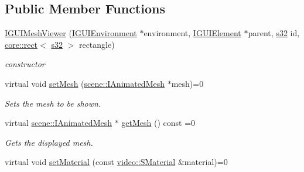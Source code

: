 \subsection*{Public Member Functions}
\begin{DoxyCompactItemize}
\item 
\mbox{\label{classirr_1_1gui_1_1IGUIMeshViewer_a36025535144bcd7fc8906071738db130}} 
\hyperlink{classirr_1_1gui_1_1IGUIMeshViewer_a36025535144bcd7fc8906071738db130}{I\+G\+U\+I\+Mesh\+Viewer} (\hyperlink{classirr_1_1gui_1_1IGUIEnvironment}{I\+G\+U\+I\+Environment} $\ast$environment, \hyperlink{classirr_1_1gui_1_1IGUIElement}{I\+G\+U\+I\+Element} $\ast$parent, \hyperlink{namespaceirr_ac66849b7a6ed16e30ebede579f9b47c6}{s32} id, \hyperlink{classirr_1_1core_1_1rect}{core\+::rect}$<$ \hyperlink{namespaceirr_ac66849b7a6ed16e30ebede579f9b47c6}{s32} $>$ rectangle)
\begin{DoxyCompactList}\small\item\em constructor \end{DoxyCompactList}\item 
\mbox{\label{classirr_1_1gui_1_1IGUIMeshViewer_a1af18c83f050af42cdd9f76df28659ec}} 
virtual void \hyperlink{classirr_1_1gui_1_1IGUIMeshViewer_a1af18c83f050af42cdd9f76df28659ec}{set\+Mesh} (\hyperlink{classirr_1_1scene_1_1IAnimatedMesh}{scene\+::\+I\+Animated\+Mesh} $\ast$mesh)=0
\begin{DoxyCompactList}\small\item\em Sets the mesh to be shown. \end{DoxyCompactList}\item 
\mbox{\label{classirr_1_1gui_1_1IGUIMeshViewer_a2e61772e79bec9c9580016151b98f37b}} 
virtual \hyperlink{classirr_1_1scene_1_1IAnimatedMesh}{scene\+::\+I\+Animated\+Mesh} $\ast$ \hyperlink{classirr_1_1gui_1_1IGUIMeshViewer_a2e61772e79bec9c9580016151b98f37b}{get\+Mesh} () const =0
\begin{DoxyCompactList}\small\item\em Gets the displayed mesh. \end{DoxyCompactList}\item 
\mbox{\label{classirr_1_1gui_1_1IGUIMeshViewer_ad840a26c63cf8b3442f61a058a7c2281}} 
virtual void \hyperlink{classirr_1_1gui_1_1IGUIMeshViewer_ad840a26c63cf8b3442f61a058a7c2281}{set\+Material} (const \hyperlink{classirr_1_1video_1_1SMaterial}{video\+::\+S\+Material} \&material)=0

\end{DoxyCompactItemize}
